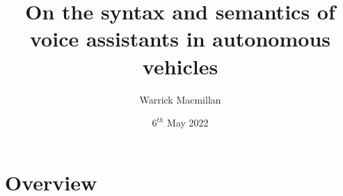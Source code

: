 \documentclass{beamer}
\title{On the syntax and semantics of voice assistants in autonomous vehicles}
\author{Warrick Macmillan}
\date{$6^{th}$ May 2022}
\begin{document}
\begin{frame}
  \titlepage
\end{frame}

\section{Overview}



\begin{frame}

\end{frame}

% 
\end{document}
